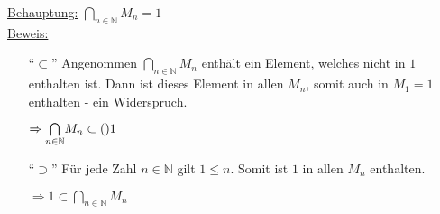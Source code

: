 \documentclass{scrreprt}
\begin{document}
\begin{enumerate}[(a)]
  \newpage
  \underline{Behauptung:} $\underset{n \in \mathbb{N}}\bigcap M_n = \qty{1}$ \\
  \underline{Beweis:}
  \begin{itemize}
  \item[``$\subset$'']
    Angenommen $\underset{n \in \mathbb{N}}\bigcap M_n$ enthält ein Element,
    welches nicht in $\qty{1}$ enthalten ist.
    Dann ist dieses Element in allen $M_n$, somit auch in $M_1 = \qty{1}$
    enthalten - ein Widerspruch.

    $\Rightarrow \underset{n \in \mathbb{N}}\bigcap M_n \subset \qty 1$

  \item[``$\supset$'']
    Für jede Zahl $n \in \mathbb{N}$ gilt $1 \leq n$.
    Somit ist $1$ in allen $M_n$ enthalten.

    $\Rightarrow \qty{1} \subset \underset{n \in \mathbb{N}}\bigcap M_n$
  \end{itemize}
\end{enumerate}
\end{document}
